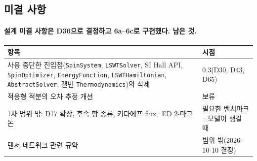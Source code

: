 \subsection{미결 사항}\label{open-questions}
\begingroup%
  \framesubtitle{설계 미결 사항은 D30으로 결정하고 6a--6c로 구현했다. 남은 것.}
  \footnotesize\renewcommand{\arraystretch}{1.05}
  \begin{tabularx}{\textwidth}{@{}Yp{3.4cm}@{}}
    \toprule
    항목 & 시점 \\
    \midrule
    사용 중단한 진입점(\texttt{SpinSystem}, \texttt{LSWTSolver}, SI Hall API, \texttt{SpinOptimizer}, \texttt{EnergyFunction}, \texttt{LSWTHamiltonian}, \texttt{AbstractSolver}, 켈빈 \texttt{Thermodynamics})의 삭제 & 0.3(D30, D43, D65) \\
    적응형 적분의 오차 추정 개선 & 보류 \\
    1차 범위 밖: D17 확장, 후속 항 종류, 키타에프 flux·ED 2-마그논 & 필요한 벤치마크·모델이 생길 때 \\
    텐서 네트워크 관련 규약 & 범위 밖(2026-10-10 결정) \\
    \bottomrule
  \end{tabularx}
  \par\medskip
\endgroup

